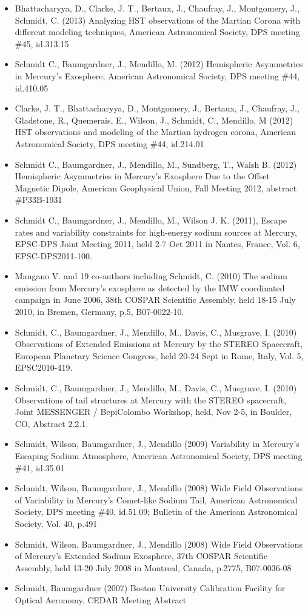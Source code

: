 \documentclass[12pt]{report}
\begin{document}
\begin{itemize}
   \item Bhattacharyya, D., Clarke, J. T., Bertaux, J., Chaufray, J., Montgomery, J., Schmidt, C. (2013) Analyzing HST observations of the Martian Corona with different modeling techniques, American Astronomical Society, DPS meeting \#45, id.313.15
   \item Schmidt C., Baumgardner, J., Mendillo, M. (2012) Hemispheric Asymmetries in Mercury's Exosphere, American Astronomical Society, DPS meeting \#44, id.410.05
   \item Clarke, J. T., Bhattacharyya, D., Montgomery, J., Bertaux, J., Chaufray, J., Gladstone, R., Quemerais, E., Wilson, J., Schmidt, C., Mendillo, M (2012) HST observations and modeling of the Martian hydrogen corona, American Astronomical Society, DPS meeting \#44, id.214.01
   \item Schmidt C., Baumgardner, J., Mendillo, M., Sundberg, T., Walsh B. (2012) Hemispheric Asymmetries in Mercury's Exosphere Due to the Offset Magnetic Dipole, American Geophysical Union, Fall Meeting 2012, abstract \#P33B-1931
   \item Schmidt C., Baumgardner, J., Mendillo, M., Wilson J. K. (2011), Escape rates and variability constraints for high-energy sodium sources at Mercury, EPSC-DPS Joint Meeting 2011, held 2-7 Oct 2011 in Nantes, France, Vol. 6, EPSC-DPS2011-100.
   \item Mangano V. and 19 co-authors including Schmidt, C. (2010) The sodium emission from Mercury's exosphere as detected by the IMW coordinated campaign in June 2006, 38th COSPAR Scientific Assembly, held 18-15 July 2010, in Bremen, Germany, p.5, B07-0022-10. 
   \item Schmidt, C., Baumgardner, J., Mendillo, M., Davis, C., Musgrave, I. (2010) Observations of Extended Emissions at Mercury by the STEREO Spacecraft, European Planetary Science Congress, held 20-24 Sept in Rome, Italy, Vol. 5, EPSC2010-419.
   \item Schmidt, C., Baumgardner, J., Mendillo, M., Davis, C., Musgrave, I. (2010) Observations of tail structures at Mercury with the STEREO spacecraft, Joint MESSENGER / BepiColombo Workshop, held, Nov 2-5, in Boulder, CO, Abstract 2.2.1. 
   \item Schmidt, Wilson, Baumgardner, J., Mendillo (2009) Variability in Mercury's Escaping Sodium Atmosphere, American Astronomical Society, DPS meeting \#41, id.35.01
   \item Schmidt, Wilson, Baumgardner, J., Mendillo (2008) Wide Field Observations of Variability in Mercury's Comet-like Sodium Tail, American Astronomical Society, DPS meeting \#40, id.51.09; Bulletin of the American Astronomical Society, Vol. 40, p.491
   \item Schmidt, Wilson, Baumgardner, J., Mendillo (2008) Wide Field Observations of Mercury's Extended Sodium Exosphere, 37th COSPAR Scientific Assembly, held 13-20 July 2008 in Montreal, Canada, p.2775, B07-0036-08
   \item Schmidt, Baumgardner (2007) Boston University Calibration Facility for Optical Aeronomy. CEDAR Meeting Abstract
  \end{itemize}
\end{document}

